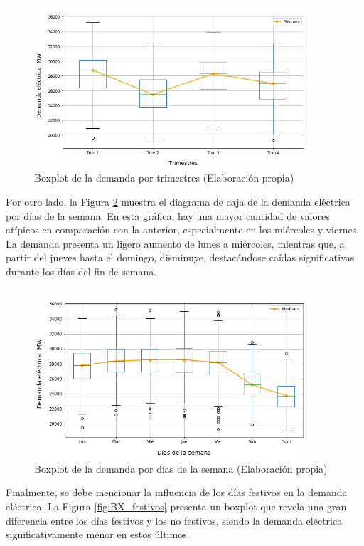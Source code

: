 \documentclass[12pt,a4paper]{report}
\begin{document}
\begin{figure}[H]
    \centering
    \includegraphics[width=0.9\textwidth]{Images/tfm-3.5A.png}
    \caption{Boxplot de la demanda por trimestres (Elaboración propia)}
    \label{fig:BX_trim}
\end{figure}

Por otro lado, la Figura \ref{fig:BX_sem} muestra el diagrama de caja de la demanda eléctrica por días de la semana. En esta gráfica, hay una mayor cantidad de valores atípicos en comparación con la anterior, especialmente en los miércoles y viernes. La demanda presenta un ligero aumento de lunes a miércoles, mientras que, a partir del jueves hasta el domingo, disminuye, destacándose caídas significativas durante los días del fin de semana.


\begin{figure}[H]
    \centering
    \includegraphics[width=0.9\textwidth]{Images/tfm-3.5B.png}
    \caption{Boxplot de la demanda por días de la semana (Elaboración propia)}
    \label{fig:BX_sem}
\end{figure}

Finalmente, se debe mencionar la influencia de los días festivos en la demanda eléctrica. La Figura \ref{fig:BX_festivos} presenta un boxplot que revela una gran diferencia entre los días festivos y los no festivos, siendo la demanda eléctrica significativamente menor en estos últimos.
\end{document}
